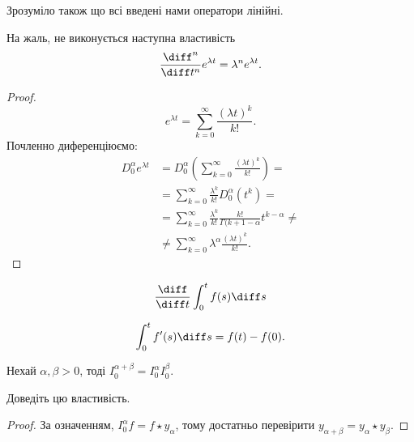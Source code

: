 Зрозуміло також що всі введені нами оператори лінійні. \medskip

\begin{proposition}
    На жаль, не виконується наступна властивість
    \begin{equation}
        \frac{\diff^n}{\diff t^n} e^{\lambda t} = \lambda^n e^{\lambda t}.
    \end{equation}
\end{proposition}

\begin{proof}
    \begin{equation}
        e^{\lambda t} = \sum_{k = 0}^\infty \frac{(\lambda t)^k}{k!}.
    \end{equation}
    Почленно диференціюємо:
    \begin{equation}
        \begin{aligned} 
            D_0^\alpha e^{\lambda t} 
            &= D_0^\alpha \left( \sum_{k = 0}^\infty \frac{(\lambda t)^k}{k!} \right) = \\
            &= \sum_{k = 0}^\infty \frac{\lambda^k}{k!} D_0^\alpha \left( t^k \right) = \\
            &= \sum_{k = 0}^\infty \frac{\lambda^k}{k!} \frac{k!}{\Gamma(k + 1 - \alpha} t^{k - \alpha} \ne \\
            &\ne \sum_{k = 0}^\infty \lambda^\alpha \frac{(\lambda t)^k}{k!}.
        \end{aligned}
    \end{equation}
\end{proof}

\begin{proposition}
    \begin{equation}
        \frac{\diff}{\diff t} \int_0^t f(s) \diff s
    \end{equation}
\end{proposition}

\begin{proposition}
    \begin{equation}
        \int_0^t f'(s) \diff s = f(t) - f(0).
    \end{equation}
\end{proposition}

\begin{proposition}
    Нехай $\alpha, \beta > 0$, тоді $I_0^{\alpha + \beta} = I_0^\alpha I_0^\beta$.
\end{proposition}
\begin{exercise}
    Доведіть цю властивість.
\end{exercise}
\begin{proof}
    За означенням, $I_0^\alpha f = f \star y_\alpha$, тому достатньо перевірити $y_{\alpha + \beta} = y_\alpha \star y_\beta$.
\end{proof}

